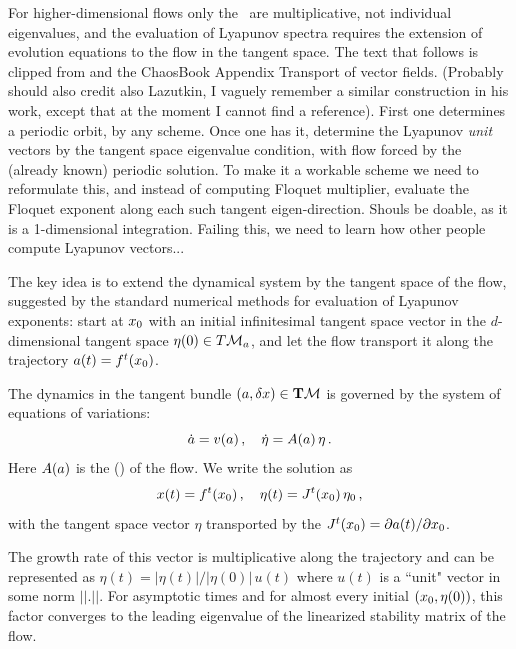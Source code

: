 For higher-dimensional flows only the \jacobianMs\ are
multiplicative, not individual eigenvalues, and the
 evaluation of Lyapunov spectra
requires the extension of evolution equations
to the flow in the tangent space.
The text that follows is clipped from 
and the ChaosBook Appendix
     {Transport of vector fields}.
(Probably should also
credit also Lazutkin, I vaguely remember a similar
construction in his work, except that at the moment
I cannot find a reference).
First one determines a periodic orbit, by any scheme.
Once one has it, determine the Lyapunov {\em unit}
vectors by the tangent space eigenvalue
condition, with flow forced by
the (already known) periodic solution. To make it a workable scheme we
need to reformulate this, and instead of computing Floquet
multiplier, evaluate the Floquet exponent along each such
tangent eigen-direction. Shouls be doable, as it is a 1-dimensional
integration. Failing this, we need to learn how other people compute
Lyapunov vectors...

The key idea is to extend the dynamical system by
the tangent space of the flow,
suggested by the standard numerical methods for evaluation of
Lyapunov exponents:      %
start at ${x_0}$ with
an initial infinitesimal tangent space vector in the
$d$-dimensional tangent space
$\eta(0) \in T{\cal M}_{a}$,
and let the flow transport it  along the
trajectory $a(t)= f^t({x_0})$.

The dynamics in the tangent bundle
$(a,{\delta x}) \in  {\bf T}{\cal M}$
is governed by the system of equations of variations:
\[
\dot{a}=v(a) \,, \quad
\dot{\eta}=A(a) \, \eta\, .
\]
Here $A(a)$ is %
the {\stabmat} (\velgradmat) of the flow.
We write the solution as
\begin{equation}
x(t)=f^t({x_0}) \,, \quad
\eta(t)=J^t({x_0}) \, \eta_0 \, ,
\label{xit}
\end{equation}
with the tangent space vector $\eta$ transported by
the {\jacobianM} $J^t({x_0}) = \partial a(t)/ \partial {x_0}$.

The growth rate of this vector is multiplicative along the trajectory
and can be represented as $\eta(t)=|{\eta}(t)|/|{\eta}(0)| \, u(t)$
where $ u(t)$ is a ``unit" vector in some norm $||.||$.
For asymptotic times and for almost every initial $({x_0},\eta(0))$,
this factor converges to the leading eigenvalue of the
linearized stability matrix of the flow.

